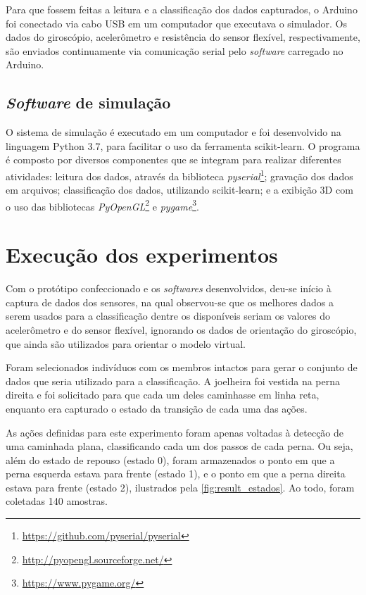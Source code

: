 Para que fossem feitas a leitura e a classificação dos dados capturados, o Arduino foi conectado via cabo USB em um computador que executava o simulador. Os dados do giroscópio, acelerômetro e resistência do sensor flexível, respectivamente, são enviados continuamente via comunicação serial pelo \textit{software} carregado no Arduino.


\subsection{\textit{Software} de simulação}\label{sec:result_simulacao}

O sistema de simulação é executado em um computador e foi desenvolvido na linguagem Python 3.7, para facilitar o uso da ferramenta scikit-learn. O programa é composto por diversos componentes que se integram para realizar diferentes atividades: leitura dos dados, através da biblioteca \textit{pyserial}\footnote{\url{https://github.com/pyserial/pyserial}}; gravação dos dados em arquivos; classificação dos dados, utilizando scikit-learn; e a exibição 3D com o uso das bibliotecas \textit{PyOpenGL}\footnote{\url{http://pyopengl.sourceforge.net/}} e \textit{pygame}\footnote{\url{https://www.pygame.org/}}.

\section{Execução dos experimentos}\label{sec:result_execucao}

Com o protótipo confeccionado e os \textit{softwares} desenvolvidos, deu-se início à captura de dados dos sensores, na qual observou-se que os melhores dados a serem usados para a classificação dentre os disponíveis seriam os valores do acelerômetro e do sensor flexível, ignorando os dados de orientação do giroscópio, que ainda são utilizados para orientar o modelo virtual.

Foram selecionados indivíduos com os membros intactos para gerar o conjunto de dados que seria utilizado para a classificação. A joelheira foi vestida na perna direita e foi solicitado para que cada um deles caminhasse em linha reta, enquanto era capturado o estado da transição de cada uma das ações.

As ações definidas para este experimento foram apenas voltadas à detecção de uma caminhada plana, classificando cada um dos passos de cada perna. Ou seja, além do estado de repouso (estado 0), foram armazenados o ponto em que a perna esquerda estava para frente (estado 1), e o ponto em que a perna direita estava para frente (estado 2), ilustrados pela \autoref{fig:result_estados}. Ao todo, foram coletadas 140 amostras.

